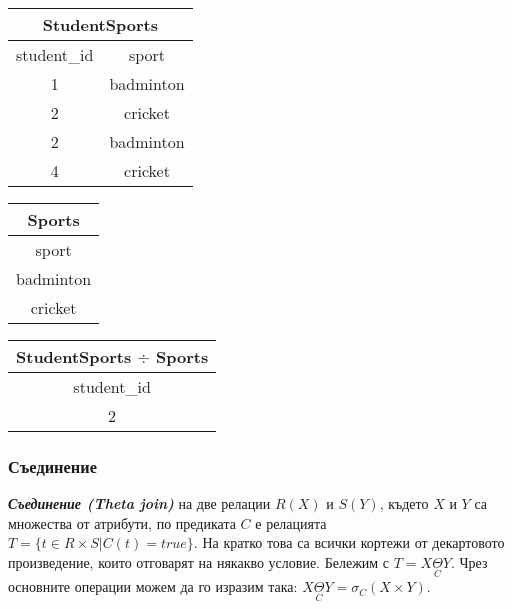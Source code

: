 \documentclass[fleqn,12pt]{article}
\begin{document}
\begin{multicols}{3}
\begin{center}
\begin{tabular}{ |c|c| }
    \hline
    \multicolumn{2}{|c|}{StudentSports} \\
    \hline
    student\_id & sport \\
    \hline
    1 & badminton \\
    2 & cricket \\
    2 & badminton \\
    4 & cricket \\
    \hline
\end{tabular}
\end{center}

\begin{center}
\begin{tabular}{ |c| } 
    \hline
    \multicolumn{1}{|c|}{Sports} \\
    \hline
    sport \\
    \hline
    badminton \\
    cricket \\
    \hline
\end{tabular}
\end{center}

\begin{center}
\begin{tabular}{ |c| } 
    \hline
    \multicolumn{1}{|c|}{StudentSports $\div$ Sports} \\
    \hline
    student\_id \\
    \hline
    2 \\
    \hline
\end{tabular}
\end{center}

\end{multicols}

\subsubsection{Съединение}
\textbf{\textit{Съединение (Theta join)}} на две релации $R(X)$ и $S(Y)$, където $X$ и $Y$ са множества от атрибути, по предиката $C$ е релацията $T = \{t \in R \times S | C(t) = true\}$.
На кратко това са всички кортежи от декартовото произведение, които отговарят на някакво условие.
\bigbreak
Бележим с $T = X \underset{C}{\Theta} Y$. Чрез основните операции можем да го изразим така: $X \underset{C}{\Theta} Y = \sigma_{C} (X \times Y)$.
\end{document}
